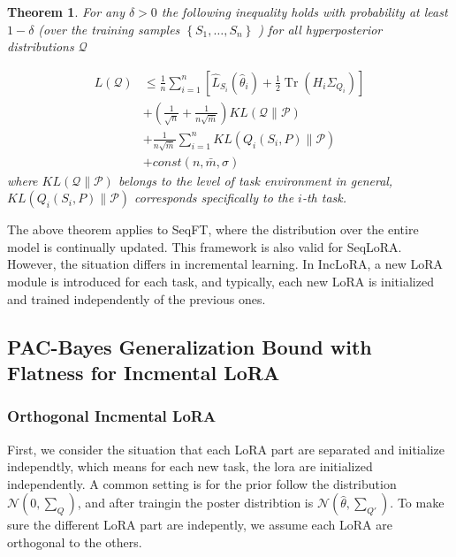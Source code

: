 \documentclass[letterpaper]{article} %
\newtheorem{theorem}{Theorem}
\begin{document}
\begin{theorem} 
For any $\delta>0$ the following inequality holds with probability at least $1-\delta$ (over the training samples $\left\{S_1, \ldots, S_n\right\}$ ) for all hyperposterior distributions $\mathcal{Q}$

$$
\begin{aligned}
 L(\mathcal{Q}) &\leq \frac{1}{n}\sum_{i=1}^n \left[ \widehat{L}_{S_i}(\hat{\theta}_i) + \frac{1}{2}\operatorname{Tr}(H_i \Sigma_{Q_i}) \right] \\
&+(\frac{1}{\sqrt{n}}+ \frac{1}{n \sqrt{\bar{m}}}) K L(\mathcal{Q} \| \mathcal{P}) \\
& +\frac{1}{n \sqrt{\bar{m}}}  \sum_{i=1}^n KL\left(Q_i\left(S_i,P\right) \|\mathcal{P}\right) \\
&+ const(n,\bar{m},\sigma)
\end{aligned}
$$
where $KL(\mathcal{Q} \| \mathcal{P})$ belongs to the level of task environment in general, $KL\left(Q_i\left(S_i,P\right) \|\mathcal{P}\right)$ corresponds specifically to the $i$-th task.
\end{theorem}

The above theorem applies to SeqFT, where the distribution over the entire model is continually updated. This framework is also valid for SeqLoRA. However, the situation differs in incremental learning. In IncLoRA, a new LoRA module is introduced for each task, and typically, each new LoRA is initialized and trained independently of the previous ones. 




\subsection{PAC-Bayes Generalization Bound with Flatness for Incmental LoRA}

\subsubsection{Orthogonal Incmental LoRA}

First,  we consider the situation that each LoRA part are separated and initialize independtly, which means for each new task, the lora are initialized independently. A common setting is for the prior follow the distribution $\mathcal{N}(0,\sum_Q)$, and after traingin the poster distribtion is $\mathcal{N}(\hat{\theta},\sum_{Q'})$. To make sure the different LoRA part are indepently, we assume each LoRA are orthogonal to the others. 
\end{document}
